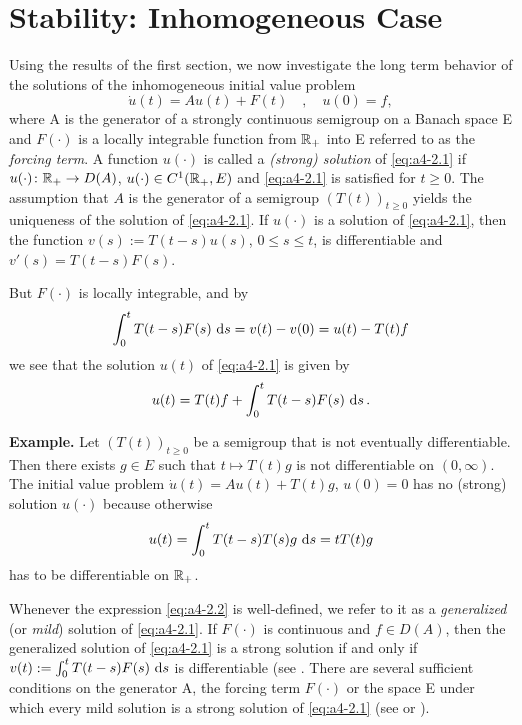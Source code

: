 \section{Stability: Inhomogeneous Case}
Using the results of the first section, we now investigate the long
term behavior of the solutions of the inhomogeneous initial value
problem
\begin{equation}\label{eq:a4-2.1}
\dot{u}(t) = Au(t) + F(t) \quad , \quad u(0) = f,
\end{equation}
where A is the generator of a strongly continuous semigroup on a
Banach space E and $F(\cdot)$ is a locally integrable function from $\mathbb{R}_{+}$
into E referred to as the \emph{forcing term}. 
A function $u(\cdot)$ is called a \emph{(strong) solution} of \eqref{eq:a4-2.1} if $u(\cdot) \colon \mathbb{R}_{+} \to D(A)$, 
$u(\cdot) \in C^{1}(\mathbb{R}_{+},E)$ and \eqref{eq:a4-2.1} is satisfied for $t \geq 0$.
The assumption that $A$ is the generator of a semigroup $(T(t))_{t \geq 0}$
yields the uniqueness of the solution of \eqref{eq:a4-2.1}. 
If $u(\cdot)$ is a solution of \eqref{eq:a4-2.1}, then the function $v(s) := T(t-s)u(s)$, $0 \leq s \leq t$, is
differentiable and $v'(s) = T(t-s)F(s)$. 

But $F(\cdot)$ is locally integrable, and by 
\[
\int_{0}^{t} T(t-s)F(s) \,\mathop{}\!\mathrm{d}{s} = v(t) - v(0) = u(t) - T(t)f
\]
we see that the solution $u(t)$ of \eqref{eq:a4-2.1} is given by
\begin{equation}\label{eq:a4-2.2}
u(t) = T(t)f + \int_{0}^{t} T(t-s)F(s) \,\mathop{}\!\mathrm{d}{s}\,.
\end{equation}


{\bf Example.} \label{ex:a4-2.1}
Let $(T(t))_{t \geq 0}$ be a semigroup that is not eventually differentiable. 
Then there
exists $g \in E$ such that $t \mapsto T(t)g$ is not differentiable on $(0,\infty)$.
The initial value problem $\dot{u}(t) = Au(t) + T(t)g$, $u(0) = 0$ has no
(strong) solution $u(\cdot)$ because otherwise
\begin{align*}
u(t) = \int_{0}^{t} T(t-s)T(s)g \,\mathop{}\!\mathrm{d}{s} = tT(t)g
\end{align*}
has to be differentiable on $\mathbb{R}_{+}$.



Whenever the expression \eqref{eq:a4-2.2} is well-defined, we refer to it as a  \emph{generalized} (or
\emph{mild}) solution of \eqref{eq:a4-2.1}. 
If $F(\cdot)$ is continuous and $f \in D(A)$, then
the generalized solution of \eqref{eq:a4-2.1} is a strong solution if and only if
$v(t) := \int_{0}^{t} T(t-s)F(s) \,\mathop{}\!\mathrm{d}{s}$ is differentiable (see \citet[Chapter~4,2.4]{pazy:1983}. 
There are several sufficient conditions on the generator A,
the forcing term $F(\cdot)$ or the space E under which every mild solution
is a strong solution of \eqref{eq:a4-2.1} (see \citet{travis:1981}
or  \citet[Section~4.2]{pazy:1983}).

